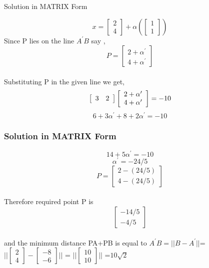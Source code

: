 \documentclass{beamer}
\begin{document}
\begin{frame}{Solution in MATRIX Form}

\[ x= \left[ 
  \begin{array}{ c  }
     2\\
     4
  \end{array} \right]+\alpha(\left[ 
  \begin{array}{ c  }
     1\\
     1
  \end{array} \right])\]
   Since P lies on the line $A^{\prime}B$  say ,\[ P =\left[ 
  \begin{array}{ c  }
     2+\alpha^{\prime}\\
     4+\alpha^{\prime}
  \end{array} \right]\]
  \\Substituting P in the given line we get,
  \[
  \left[ 
  \begin{array}{ c c }
    3 & 2 \\
     
  \end{array} \right] \left[ 
  \begin{array}{ c  }
     2+\alpha^{\prime}\\
     4+\alpha^{\prime}
  \end{array} \right] =-10
  \]
  \[ 6+3\alpha^{\prime}+8+2\alpha^{\prime}=-10\]
 \end{frame}
\begin{frame}
\frametitle{Solution in MATRIX Form}
\[ 14+ 5\alpha^{\prime} = -10 \]
\[ \alpha^{\prime}= -24/5 \]
\[ P =  \left[ 
  \begin{array}{ c  }
     2-(24/5)\\
     4-(24/5)
  \end{array} \right]\]
  \\Therefore required point P is \[\left[ 
  \begin{array}{ c  }
     -14/5\\
     -4/5
  \end{array} \right] 
  \]
  \\ and the minimum distance PA+PB  is equal to $A^{\prime}B =||B-A^{\prime}||$= $||\left[ 
  \begin{array}{ c  }
     2\\
     4
  \end{array} \right] - \left[ 
  \begin{array}{ c  }
     -8\\
     -6
  \end{array} \right]||$ = $|| \left[ 
  \begin{array}{ c  }
     10\\
     10
  \end{array} \right] ||$ =$10\sqrt{2}$


\end{frame}
\end{document}
